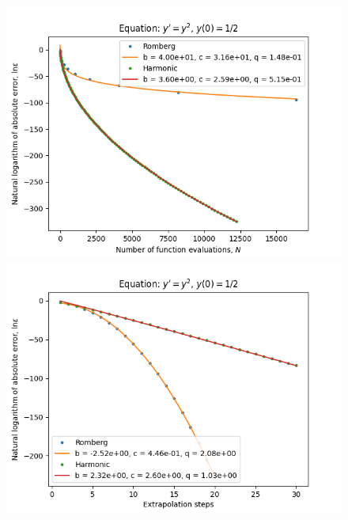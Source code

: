 \begin{figure}[H]
\centering
\begin{minipage}{0.45\textwidth}
\centering
\includegraphics[scale=0.45]{../results/emr_plots/singularity_0_hp_trend.png}
\end{minipage}
\begin{minipage}{0.45\textwidth}
\centering
\includegraphics[scale=0.45]{../results/emr_plots/singularity_0_hp_steps.png}
\end{minipage}
\end{figure}

